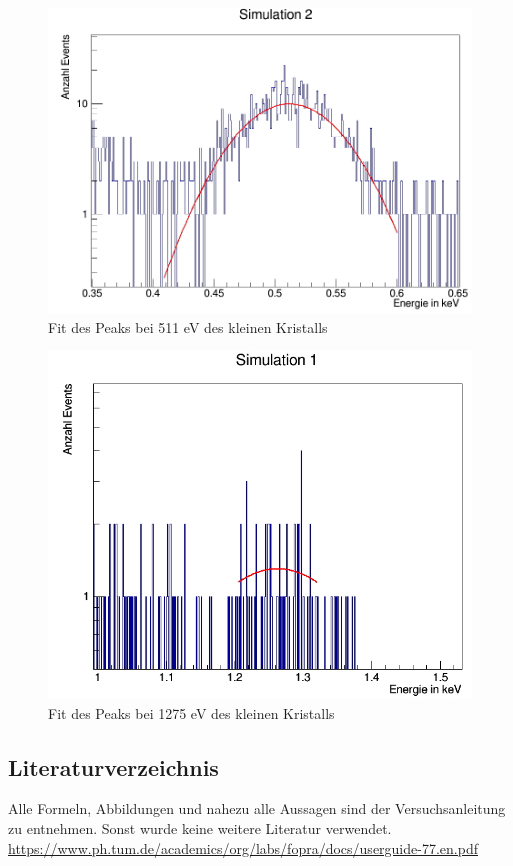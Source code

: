 \documentclass[a4paper,14pt,twoside]{article}
\begin{document}
\begin{figure}[H]
	\begin{center}
		\includegraphics[width=0.7\linewidth]{Simulation2_511_fit}
		\caption{Fit des Peaks bei 511 eV des kleinen Kristalls}
		\label{}
	\end{center}
\end{figure}

\begin{figure}[H]
	\begin{center}
		\includegraphics[width=0.7\linewidth]{Simulation2_1275_fit}
		\caption{Fit des Peaks bei 1275 eV des kleinen Kristalls}
		\label{S2_1275_fit}
	\end{center}
\end{figure}


		
	\subsection{Literaturverzeichnis}
		Alle Formeln, Abbildungen und nahezu alle Aussagen sind der Versuchsanleitung zu entnehmen. 
	Sonst wurde keine weitere Literatur verwendet.\\
	\url{https://www.ph.tum.de/academics/org/labs/fopra/docs/userguide-77.en.pdf} \\
	
%
%
%
%
%
\end{document}
